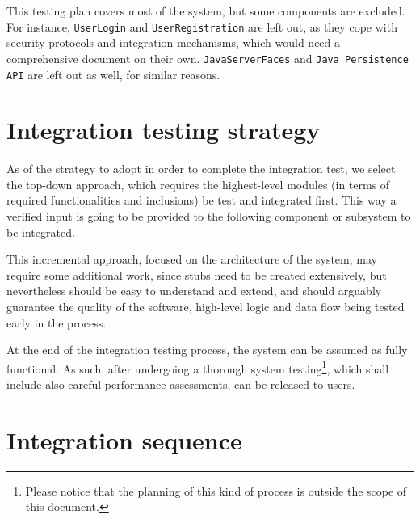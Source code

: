 This testing plan covers most of the system, but some components are excluded. For instance, \texttt{User\-Login} and \texttt{User\-Registration} are left out, as they cope with security protocols and integration mechanisms, which would need a comprehensive document on their own. \texttt{Java\-Server\-Faces} and \texttt{Java Persistence API} are left out as well, for similar reasons.



\section{Integration testing strategy}\label{sec:strategy}
As of the strategy to adopt in order to complete the integration test, we select the \mbox{top-down} approach, which requires the \mbox{highest-level} modules (in terms of required functionalities and inclusions) be test and integrated first. This way a verified input is going to be provided to the following component or subsystem to be integrated.

This incremental approach, focused on the architecture of the system, may require some additional work, since stubs need to be created extensively, but nevertheless should be easy to understand and extend, and should arguably guarantee the quality of the software, \mbox{high-level} logic and data flow being tested early in the process.

At the end of the integration testing process, the system can be assumed as fully functional. As such, after undergoing a thorough system testing\footnote{Please notice that the planning of this kind of process is outside the scope of this document.}, which shall include also careful performance assessments, can be released to users.





\section{Integration sequence}\label{sec:intsequence}

